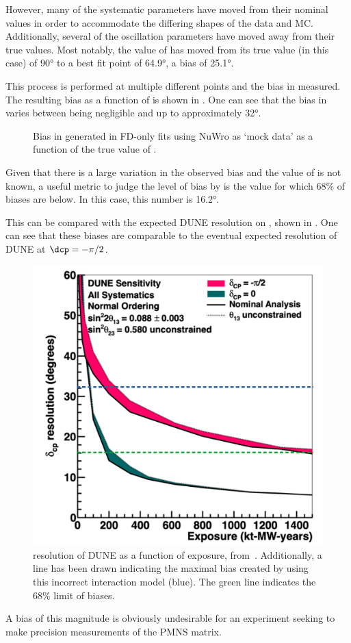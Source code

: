 However, many of the systematic parameters have moved from their nominal values in order to accommodate the differing shapes of the data and MC.
Additionally, several of the oscillation parameters have moved away from their true values.
Most notably, the value of \dcp has moved from its true value (in this case) of \ang{90} to a best fit point of \ang{64.9}, a bias of \ang{25.1}.

This process is performed at multiple different \dcp points and the bias in \dcp measured. 
The resulting bias as a function of \dcpTrue is shown in .
One can see that the bias in \dcp varies between being negligible and up to approximately \ang{32}. 

\begin{figure}[h]
	\begin{adjustbox}{max totalsize=.6\linewidth, center}
		
	\end{adjustbox}
	\caption[Example of \dcp bias in FD-only fits using NuWro data]{Bias in \dcp generated in FD-only fits using NuWro as `mock data' as a function of the true value of \dcp.}
	\label{fig:dcpBiasNoWgt}
\end{figure}

Given that there is a large variation in the observed bias and the value of \dcp is not known, a useful metric to judge the level of bias by is the value for which 68\% of biases are below.
In this case, this number is \ang{16.2}.

This can be compared with the expected DUNE resolution on \dcp, shown in . 
One can see that these biases are comparable to the eventual expected \dcp resolution of DUNE at $\dcp = -\pi/2$.
\begin{figure}[h]
	\centering
	\includegraphics[width=.5\linewidth]{files/figures/dune_ndrwt/dcpResWithLines-cropped}
	\caption[\dcp resolution of DUNE as a function of exposure]{\dcp resolution of DUNE as a function of exposure, from~\cite{Abi:2020qib}. Additionally, a line has been drawn indicating the maximal \dcp bias created by using this incorrect interaction model (blue). The green line indicates the 68\% limit of \dcp biases.}
	\label{fig:dcpResDUNE}
\end{figure}
A bias of this magnitude is obviously undesirable for an experiment seeking to make precision measurements of the PMNS matrix.

